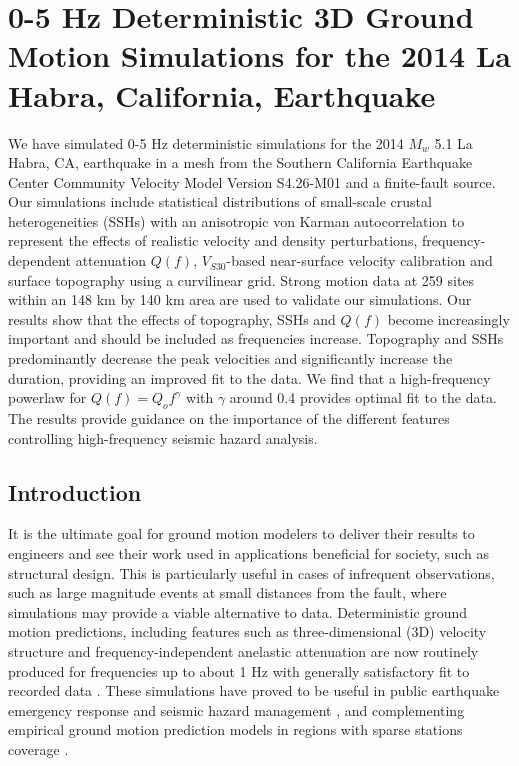 
\linespread{1.7}
\chapter{0-5 Hz Deterministic 3D Ground Motion Simulations for the 2014 La Habra, California, Earthquake}
\linespread{2.0}
\label{chap:highf}

\graphicspath{{/Users/zhh076/work/PhD_way/high_f/}}

We have simulated 0-5 Hz deterministic simulations for the 2014 $M_w$ 5.1 La Habra, CA, earthquake in a mesh from the Southern California Earthquake Center Community Velocity Model Version S4.26-M01 and a finite-fault source. Our simulations include statistical distributions of small-scale crustal heterogeneities (SSHs) with an anisotropic von Karman autocorrelation to represent the effects of realistic velocity and density perturbations, frequency-dependent attenuation $Q(f)$, $V_{S30}$-based near-surface velocity calibration and surface topography using a curvilinear grid. Strong motion data at 259 sites within an 148 km by 140 km area are used to validate our simulations. Our results show that the effects of topography, SSHs and $Q(f)$ become increasingly important and should be included as frequencies increase. Topography and SSHs predominantly decrease the peak velocities and significantly increase the duration, providing an improved fit to the data. We find that a high-frequency powerlaw for $Q(f)=Q_o f^{\gamma}$ with $\gamma$ around 0.4 provides optimal fit to the data. The results provide guidance on the importance of the different features controlling high-frequency seismic hazard analysis.


\section{Introduction} \label{highf:intro}
It is the ultimate goal for ground motion modelers to deliver their results to engineers and see their work used in applications beneficial for society, such as structural design. This is particularly useful in cases of infrequent observations, such as large magnitude events at small distances from the fault, where simulations may provide a viable alternative to data. Deterministic ground motion predictions, including features such as three-dimensional (3D) velocity structure and frequency-independent anelastic attenuation are now routinely produced for frequencies up to about 1 Hz with generally satisfactory fit to recorded data . These simulations have proved to be useful in public earthquake emergency response and seismic hazard management \citep{gravesBroadbandGroundMotionSimulation2010}, and complementing empirical ground motion prediction models in regions with sparse stations coverage .

